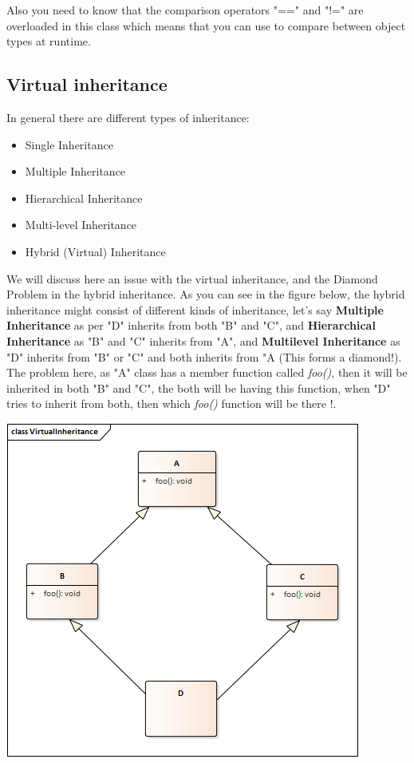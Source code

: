 \documentclass{article}
\begin{document}
Also you need to know that the comparison operators "==" and "!=" are overloaded in this class which means that you can use to compare between object types at runtime.


\subsection{Virtual inheritance}
In general there are different types of inheritance:
\begin{itemize}
  \item Single Inheritance
  \item Multiple Inheritance
  \item Hierarchical Inheritance
  \item Multi-level Inheritance
  \item Hybrid (Virtual) Inheritance
\end{itemize}

We  will discuss here an issue with the virtual inheritance, and the Diamond Problem in the hybrid inheritance.
As you can see in the figure below, the hybrid inheritance might consist of different kinds of inheritance, let's say \textbf{Multiple Inheritance} as per "D" inherits from both "B" and "C", and \textbf{Hierarchical Inheritance} as "B" and "C" inherits from "A", and \textbf{Multilevel Inheritance} as "D" inherits from "B" or "C" and both inherits from "A (This forms a diamond!).\\

The problem here, as "A" class has a member function called \textit{foo()}, then it will be inherited in both "B" and "C", the both will be having this function, when "D" tries to inherit from both, then which \textit{foo()} function will be there !.\\
\begin{center}
  \includegraphics[scale=0.75]{./imgs/VirtualInheritance.png}
\end{center}
\end{document}
